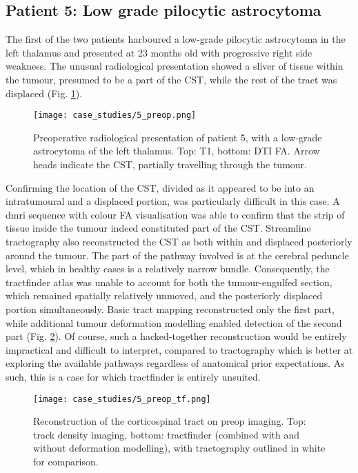\subsection{Patient 5: Low grade pilocytic astrocytoma}


The first of the two patients harboured a low-grade pilocytic astrocytoma in the left thalamus and presented at 23 months old with progressive right side weakness.
The unusual radiological presentation showed a sliver of tissue within the tumour, presumed to be a part of the CST, while the rest of the tract was displaced (Fig. \ref{fig:5p}).

\begin{figure}
  \centering
  \texttt{[image: case\_studies/5\_preop.png]}
  \caption{Preoperative radiological presentation of patient 5, with a low-grade astrocytoma of the left thalamus. Top: T1, bottom: DTI FA. Arrow heads indicate the CST, partially travelling through the tumour.}
  \label{fig:5p}
\end{figure}

Confirming the location of the CST, divided as it appeared to be into an intratumoural and a displaced portion, was particularly difficult in this case.
A \gls{dmri} sequence with colour FA visualisation was able to confirm that the strip of tissue inside the tumour indeed constituted part of the CST.
Streamline tractography also reconstructed the CST as both within and displaced posteriorly around the tumour.
The part of the pathway involved is at the cerebral peduncle level, which in healthy cases is a relatively narrow bundle.
Consequently, the tractfinder atlas was unable to account for both the tumour-engulfed section, which remained spatially relatively unmoved, and the posteriorly displaced portion simultaneously.
Basic tract mapping reconstructed only the first part, while additional tumour deformation modelling enabled detection of the second part (Fig. \ref{fig:5p_cst}).
Of course, such a hacked-together reconstruction would be entirely impractical and difficult to interpret, compared to tractography which is better at exploring the available pathways regardless of anatomical prior expectations.
As such, this is a case for which tractfinder is entirely unsuited.

\begin{figure}
  \centering
  \texttt{[image: case\_studies/5\_preop\_tf.png]}
  \caption{Reconstruction of the corticospinal tract on preop imaging. Top: track density imaging, bottom: tractfinder (combined with and without deformation modelling), with tractography outlined in white for comparison.}
  \label{fig:5p_cst}
\end{figure}

